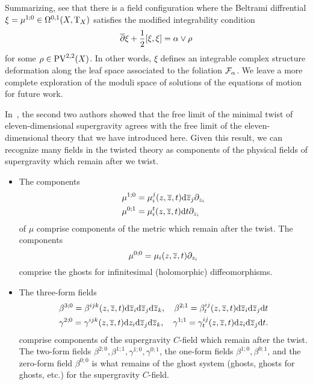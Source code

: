 Summarizing, see that there is a field configuration where the Beltrami diffrential $\xi = \mu^{1;0} \in \Omega^{0,1}(X, {\rm T}_X)$ satisfies the modified integrability condition
\[
\overline{\partial} \xi + \frac12  [\xi , \xi] = \alpha \vee \rho
\]
for some $\rho \in {\rm PV}^{2,2} (X)$. 
In other words, $\xi$ defines an integrable complex structure deformation along the leaf space associated to the foliation $\mathcal F_\alpha$. 
We leave a more complete exploration of the moduli space of solutions of the equations of motion for future work. 

In~\cite{SWspinor}, the second two authors showed that the free limit of the minimal twist of eleven-dimensional supergravity agrees with the free limit of the eleven-dimensional theory that we have introduced here. 
Given this result, we can recognize many fields in the twisted theory as components of the physical fields of supergravity which remain after we twist. 

\begin{itemize}
\item 
The components 
\begin{align*}
\mu^{1;0} & = \mu^j_i(z,\overline{z},t) {\rm d} \overline{z}_j \partial_{z_i} \\
\mu^{0;1} & = \mu^t_i (z,\overline{z},t) {\rm d} t \partial_{z_i}
\end{align*}
of $\mu$ comprise components of the metric which remain after the twist. 
The components 
\[
\mu^{0;0} = \mu_i (z,\overline{z},t) \partial_{z_i} 
\]
comprise the ghosts for infinitesimal (holomorphic) diffeomorphisms. 
\item 
The three-form fields
\begin{multline}
\beta^{3;0} = \beta^{ijk} (z,\overline{z},t) {\rm d} \overline{z}_i {\rm d} \overline{z}_j {\rm d} \overline{z}_k , \quad \beta^{2;1} = \beta^{ij}_t (z,\overline{z},t) {\rm d} \overline{z}_i {\rm d} \overline{z}_j {\rm d} t \\
\gamma^{2;0} = \gamma^{ijk} (z,\overline{z},t) {\rm d} z_i {\rm d} \overline{z}_j {\rm d} \overline{z}_k , \quad \gamma^{1;1} = \gamma^{ij}_t (z,\overline{z},t) {\rm d} z_i {\rm d} \overline{z}_j {\rm d} t .
\end{multline} 
comprise components of the supergravity $C$-field which remain after the twist. 
The two-form fields $\beta^{2;0}, \beta^{1;1}, \gamma^{1;0}, \gamma^{0;1}$, the one-form fields $\beta^{1;0}, \beta^{0;1}$, and the zero-form field $\beta^{0;0}$ is what remains of the ghost system (ghosts, ghosts for ghosts, etc.) for the supergravity $C$-field. 
\end{itemize}

